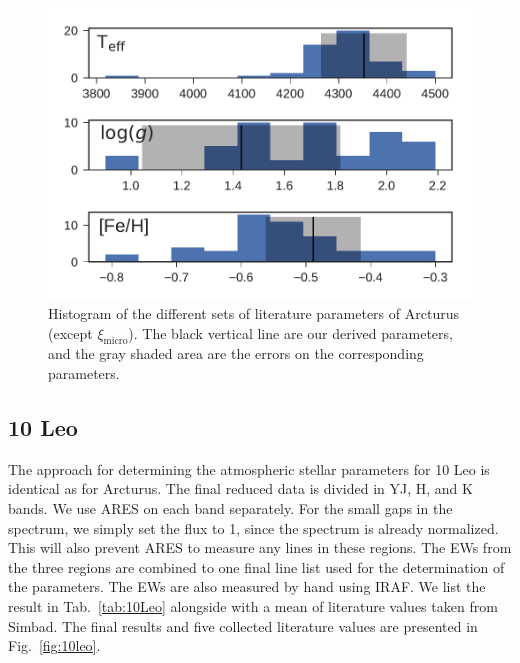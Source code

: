\documentclass{aa}
\begin{document}
\begin{figure}[htpb!]
    \centering
    \includegraphics[width=1.0\linewidth]{figures/ArcturusParams.pdf}
    \caption{Histogram of the different sets of literature parameters of
             Arcturus (except $\xi_\mathrm{micro}$). The black vertical line are
             our derived parameters, and the gray shaded area are the errors on
             the corresponding parameters.}
    \label{fig:arcturus}
\end{figure}



\subsection{10 Leo}
\label{sec:10Leo}

The approach for determining the atmospheric stellar parameters for 10 Leo is
identical as for Arcturus. The final reduced data is divided in YJ, H, and K
bands. We use ARES on each band separately. For the small gaps in the spectrum,
we simply set the flux to 1, since the spectrum is already normalized. This
will also prevent ARES to measure any lines in these regions. The EWs from the
three regions are combined to one final line list used for the determination of
the parameters. The EWs are also measured by hand using IRAF. We list the result
in Tab.~\ref{tab:10Leo} alongside with a mean of literature values taken from
Simbad. The final results and five collected literature values are presented in
Fig.~\ref{fig:10leo}.
\end{document}
